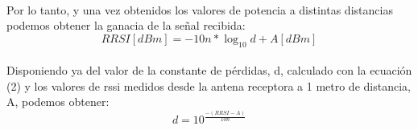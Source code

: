 \documentclass[a4paper ,12pt, onecolumn]{article}
\begin{document}
            \paragraph{}
            Por lo tanto, y una vez obtenidos los valores de potencia a distintas distancias podemos obtener la ganacia
            de la señal recibida:
            \begin{equation}
                RRSI [dBm] = -10n*\log_{10} d+ A[dBm]
            \end{equation}
            \paragraph{}
            Disponiendo ya del valor de la constante de pérdidas, d, calculado con la ecuación (2) y los valores
            de rssi medidos desde la antena receptora a 1 metro de distancia, A, podemos obtener:
            \begin{equation}
                d= 10^\frac{-(RRSI - A) }{10n}
            \end{equation}
\end{document}
